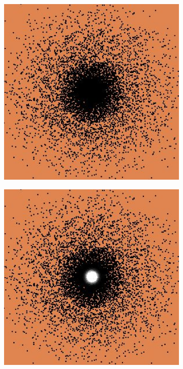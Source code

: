 \documentclass [MS] {UCLAthesis}
\begin{document}
\begin{figure}
    \centering
    \begin{subfigure}[b]{0.20\textwidth}
        \centering
        \includegraphics[width=\textwidth]{fixation2}
        \caption{}
    \end{subfigure}
    \hfill
    \centering
    \begin{subfigure}[b]{0.20\textwidth}
        \centering
        \includegraphics[width=\textwidth]{fixation3}

\end{subfigure}
\end{figure}
\end{document}
